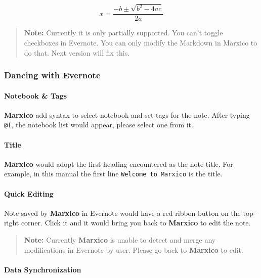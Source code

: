 \[ x = \dfrac{-b \pm \sqrt{b^2 - 4ac}}{2a} \]

\begin{quote}
\textbf{Note:} Currently it is only partially supported. You can't
toggle checkboxes in Evernote. You can only modify the Markdown in
Marxico to do that. Next version will fix this.
\end{quote}

\subsubsection{Dancing with Evernote}\label{dancing-with-evernote}

\paragraph{Notebook \& Tags}\label{notebook-tags}

\textbf{Marxico} add syntax to select notebook and set tags for the
note. After typing \texttt{@(}, the notebook list would appear, please
select one from it.

\paragraph{Title}\label{title}

\textbf{Marxico} would adopt the first heading encountered as the note
title. For example, in this manual the first line
\texttt{Welcome\ to\ Marxico} is the title.

\paragraph{Quick Editing}\label{quick-editing}

Note saved by \textbf{Marxico} in Evernote would have a red ribbon
button on the top-right corner. Click it and it would bring you back to
\textbf{Marxico} to edit the note.

\begin{quote}
\textbf{Note:} Currently \textbf{Marxico} is unable to detect and merge
any modifications in Evernote by user. Please go back to
\textbf{Marxico} to edit.
\end{quote}

\paragraph{Data Synchronization}\label{data-synchronization}

